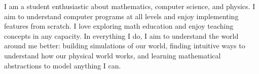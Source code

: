 \documentclass[8pt]{developercv} %
\begin{document}
\vspace{0.5cm}



\begin{minipage}[t]{0.4\textwidth} %
	\vspace{-\baselineskip} %
	
	I am a student enthusiastic about mathematics, computer science, and physics. I aim to understand computer programs at 
	all levels and enjoy implementing features from scratch. I love exploring math education and enjoy teaching
	concepts in any capacity. In everything I do, I aim to understand the world around me better: building
	simulations of our world, finding intuitive ways to understand how our physical world works, and learning mathematical abstractions
	to model anything I can. 
\end{minipage}
\hfill %
\begin{minipage}[t]{0.5\textwidth} %
	\vspace{-\baselineskip} %
	\begin{barchart}{5.5}
	\end{barchart}
\end{minipage}

\begin{center}
\end{center}


\end{document}
